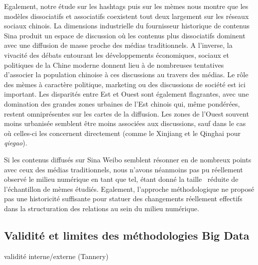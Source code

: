 Egalement, notre \'etude sur les hashtags puis sur les m\`emes nous montre que les mod\`eles dissociatifs et associatifs coexistent tout deux largement sur les r\'eseaux sociaux chinois. La dimensions industrielle du fournisseur historique de contenus Sina produit un espace de discussion o\`u les contenus plus dissociatifs dominent avec une diffusion de masse proche des m\'edias traditionnels. A l{\textquoteright}inverse, la vivacit\'e des d\'ebats entourant les d\'eveloppements \'economiques, sociaux et politiques de la Chine moderne donnent lieu \`a de nombreuses tentatives d{\textquoteright}associer la population chinoise \`a ces discussions au travers des m\'edias. Le r\^ole des m\`emes \`a caract\`ere politique, marketing ou des discussions de soci\'et\'e est ici important. Les disparit\'es entre Est et Ouest sont \'egalement flagrantes, avec une domination des grandes zones urbaines de l{\textquoteright}Est chinois qui, m\^eme pond\'er\'ees, restent omnipr\'esentes sur les cartes de la diffusion. Les zones de l{\textquoteright}Ouest souvent moins urbanis\'ee semblent \^etre moins associ\'ees aux discussions, sauf dans le cas o\`u celles-ci les concernent directement (comme le Xinjiang et le Qinghai pour \textit{qiegao}).

Si les contenus diffus\'es sur Sina Weibo semblent r\'esonner en de nombreux points avec ceux des m\'edias traditionnels, nous n{\textquoteright}avons n\'eanmoins pas pu r\'eellement observ\'e le milieu num\'erique en tant que tel, \'etant donn\'e la taille \ r\'eduite de l{\textquoteright}\'echantillon de m\`emes \'etudi\'es. Egalement, l{\textquoteright}approche m\'ethodologique ne propos\'e pas une historicit\'e suffisante pour statuer des changements r\'eellement effectifs dans la structuration des relations au sein du milieu num\'erique.
 


\subsection[Validité et limites des méthodologies Big Data]{Validité et limites des méthodologies Big Data}


validité interne/externe (Tannery)


% 
% 
% 
 
